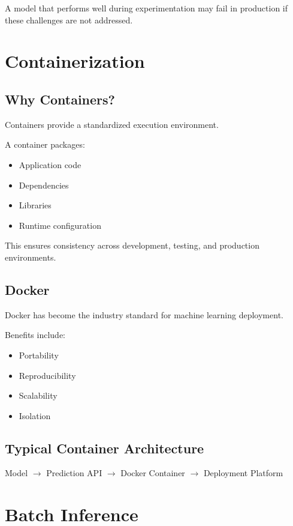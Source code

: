 A model that performs well during experimentation may fail in production if these challenges are not addressed.

\section{Containerization}

\subsection{Why Containers?}

Containers provide a standardized execution environment.

A container packages:

\begin{itemize}
    \item Application code
    \item Dependencies
    \item Libraries
    \item Runtime configuration
\end{itemize}

This ensures consistency across development, testing, and production environments.

\subsection{Docker}

Docker has become the industry standard for machine learning deployment.

Benefits include:

\begin{itemize}
    \item Portability
    \item Reproducibility
    \item Scalability
    \item Isolation
\end{itemize}

\subsection{Typical Container Architecture}

\begin{center}
Model
$\rightarrow$
Prediction API
$\rightarrow$
Docker Container
$\rightarrow$
Deployment Platform
\end{center}

\section{Batch Inference}

